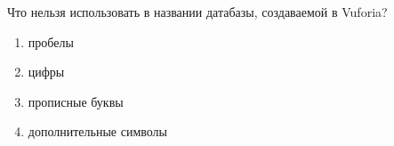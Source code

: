 
Что нельзя использовать в названии датабазы, создаваемой в Vuforia?

\begin{enumerate}
    \item пробелы
    \item цифры
    \item прописные буквы
    \item дополнительные символы
\end{enumerate}